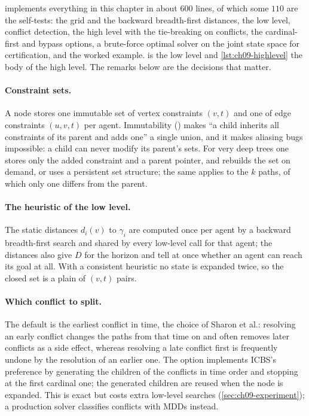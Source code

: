  implements everything in this chapter in about
$600$ lines, of which some $110$ are the self-tests: the grid and the backward breadth-first distances, the low
level, conflict detection, the high level with the tie-breaking on
conflicts, the cardinal-first and bypass options, a brute-force optimal
solver on the joint state space for certification, and the worked example.
 is the low level and \cref{lst:ch09-highlevel} the
body of the high level. The remarks below are the decisions that matter.

\paragraph{Constraint sets.} A node stores one immutable set of vertex
constraints $(v, t)$ and one of edge constraints $(u, v, t)$ per agent.
Immutability () makes ``a child inherits all constraints of
its parent and adds one'' a single union, and it makes aliasing bugs
impossible: a child can never modify its parent's sets. For very deep trees
one stores only the added constraint and a parent pointer, and rebuilds the
set on demand, or uses a persistent set structure; the same applies to the
$k$ paths, of which only one differs from the parent.

\paragraph{The heuristic of the low level.} The static distances $d_i(v)$
to $\gamma_i$ are computed once per agent by a backward breadth-first
search and shared by every low-level call for that agent; the distances
also give $D$ for the horizon and tell at once whether an agent can reach
its goal at all. With a consistent heuristic no state is expanded twice, so
the closed set is a plain  of $(v, t)$ pairs.

\paragraph{Which conflict to split.} The default is the earliest conflict
in time, the choice of Sharon et al.: resolving an early conflict changes
the paths from that time on and often removes later conflicts as a side
effect, whereas resolving a late conflict first is frequently undone by the
resolution of an earlier one. The option  implements
ICBS's preference by generating the children of the conflicts in time
order and stopping at the first cardinal one; the generated children are
reused when the node is expanded. This is exact but costs extra low-level
searches (\cref{sec:ch09-experiment}); a production solver classifies
conflicts with MDDs instead.

